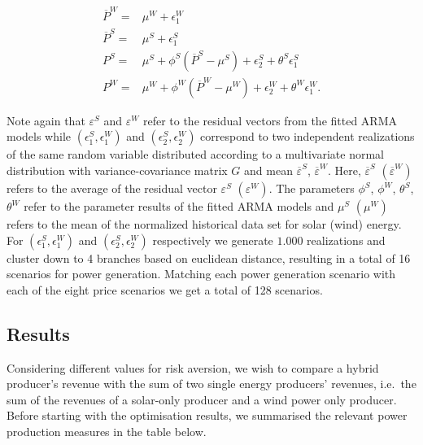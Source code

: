 \begin{align}
\overline{P}^{W}=& \mu^W+\epsilon_1^W\\
\overline{P}^{S}=& \mu^S+\epsilon_1^S\\
{P}^{S}=&\mu^S + \phi^S \left(\overline{P}^{S}-\mu^S\right)+\epsilon^S_2 + \theta^S\epsilon^S_1\\
{P}^{W}=&\mu^W + \phi^W \left(\overline{P}^{W}-\mu^W\right)+\epsilon^W_2 + \theta^W\epsilon^W_1.
\end{align}


Note again that $\varepsilon^S$ and $\varepsilon^W$ refer to the residual vectors from the fitted ARMA models while $\left(\epsilon_1^S,\epsilon_1^W\right)$ and $\left(\epsilon_2^S,\epsilon_2^W\right)$ correspond to two independent realizations of the same random variable distributed according to a multivariate normal distribution with variance-covariance matrix $G$ and mean $\overline{\varepsilon}^S$, $\overline{\varepsilon}^W$. Here, $\overline{\varepsilon}^S$ $\left(\overline{\varepsilon}^W\right)$ refers to the average of the residual vector $\varepsilon^S$ $\left(\varepsilon^W\right)$. The parameters $\phi^S$, $\phi^W$, $\theta^S$, $\theta^W$ refer to the parameter results of the fitted ARMA models and $\mu^S$ $\left(\mu^W\right)$ refers to the mean of the normalized historical data set for solar (wind) energy. For $\left(\epsilon_1^S,\epsilon_1^W\right)$ and $\left(\epsilon_2^S,\epsilon_2^W\right)$ respectively we generate $1.000$ realizations and cluster down to 4 branches based on euclidean distance, resulting in a total of 16 scenarios for power generation. Matching each power generation scenario with each of the eight price scenarios we get a total of 128 scenarios.




\subsection{Results}





Considering different values for risk aversion, we wish to compare a hybrid producer's revenue with the sum of two single energy producers' revenues, i.e.\ the sum of the revenues of a solar-only producer and a wind power only producer. Before starting with the optimisation results, we summarised the relevant power production measures in the table below. 


